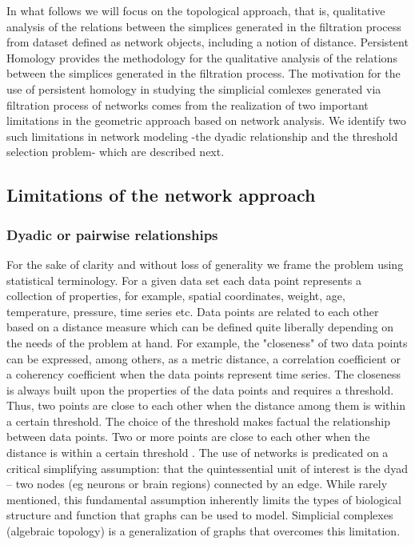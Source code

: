 \documentclass[onecollarge,runningheads]{svjour2}
\begin{document}
In what follows we will focus on the topological approach, that is, qualitative analysis of the relations between the simplices generated in the filtration process from dataset defined as network objects, including a notion of distance.
Persistent Homology provides the methodology for the qualitative analysis of the relations between the simplices generated in the filtration process. The motivation for the use of persistent homology in studying the simplicial comlexes generated via filtration process of networks comes from the realization of two important limitations in the geometric approach based on network analysis. We identify two such limitations in network modeling -the dyadic relationship and the threshold selection problem- which are described next.

\subsection{Limitations of the network approach}
\label{se:limita}

\subsubsection{Dyadic or pairwise relationships}
\label{sse:dy}
For the sake of clarity and without loss of generality we frame the problem using statistical terminology.
For a given data set each data point represents a collection of properties, for example, spatial coordinates, weight, age, temperature, pressure, time series etc. Data points are related to each other based on a distance measure which can be defined quite liberally depending on the needs of the problem at hand. For example, the "closeness" of two data points can be expressed, among others, as a metric distance, a correlation coefficient or a coherency coefficient when the data points represent time series.
The closeness is always built upon the properties of the data points and requires a threshold. Thus, two points are close to each other when the distance among them is within a certain threshold. The choice of the threshold makes factual the relationship between data points. Two or more points are close to each other when the distance is within a certain threshold \cite{giusti2016two}. The use of networks is predicated on a critical simplifying assumption: that the quintessential unit of interest is the dyad – two nodes (eg neurons or brain regions) connected by an edge. While rarely mentioned, this fundamental assumption inherently limits the types of biological structure and function that graphs can be used to model. Simplicial complexes (algebraic topology) is a generalization of graphs that overcomes this limitation.
\end{document}
